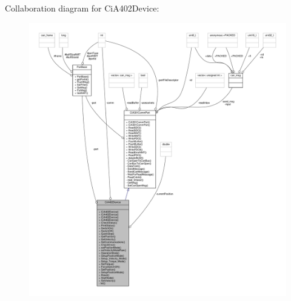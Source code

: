 Collaboration diagram for Ci\+A402\+Device\+:
\nopagebreak
\begin{figure}[H]
\begin{center}
\leavevmode
\includegraphics[width=350pt]{classCiA402Device__coll__graph}
\end{center}
\end{figure}
